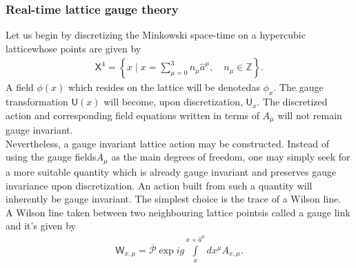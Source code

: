 \subsubsection*{Real-time lattice gauge theory} 
Let us begin by discretizing the Minkowski space-time on a hypercubic latticewhose points are given by
\begin{align*}
    \textsf{X}^4=\left\{x \mid x=\sum_{\mu=0}^{3} n_{\mu} \widehat{a}^{\mu}, \quad n_{\mu} \in \mathbb{Z}\right\}.
\end{align*}
A field $\phi(x)$ which resides on the lattice will be denotedas $\phi_x$. The gauge transformation $\textsf{U}(x)$ will become, upon discretization, $\textsf{U}_x$. The discretized action and corresponding field equations written in terms of $A_\mu$ will not remain gauge invariant. \\
Nevertheless, a gauge invariant lattice action may be constructed. Instead of using the gauge fields$A_\mu$ as the main degrees of freedom, one may simply seek for a more suitable quantity which is already gauge invariant and preserves gauge invariance upon discretization. An action built from such a quantity will inherently be gauge invariant. The simplest choice is the trace of a Wilson line.  \\
A Wilson line taken between two neighbouring lattice pointsis called a {\sffamily\color{ming}gauge link} and it's given by
\begin{align*}
    \textsf{W}_{x, \mu}=\overline{\mathcal{P}} \exp{i g \int\limits_{x}^{x+\widehat{a}^{\mu}} d x^{\mu} A_{x,\mu}}.
\end{align*}
